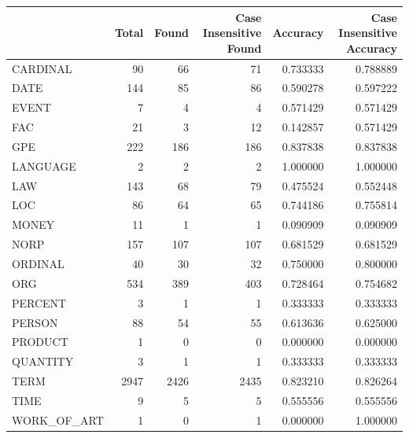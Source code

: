 \begin{tabular}{lrrrrr}
\toprule
 & Total & Found & Case Insensitive Found & Accuracy & Case Insensitive Accuracy \\
\midrule
CARDINAL & 90 & 66 & 71 & 0.733333 & 0.788889 \\
DATE & 144 & 85 & 86 & 0.590278 & 0.597222 \\
EVENT & 7 & 4 & 4 & 0.571429 & 0.571429 \\
FAC & 21 & 3 & 12 & 0.142857 & 0.571429 \\
GPE & 222 & 186 & 186 & 0.837838 & 0.837838 \\
LANGUAGE & 2 & 2 & 2 & 1.000000 & 1.000000 \\
LAW & 143 & 68 & 79 & 0.475524 & 0.552448 \\
LOC & 86 & 64 & 65 & 0.744186 & 0.755814 \\
MONEY & 11 & 1 & 1 & 0.090909 & 0.090909 \\
NORP & 157 & 107 & 107 & 0.681529 & 0.681529 \\
ORDINAL & 40 & 30 & 32 & 0.750000 & 0.800000 \\
ORG & 534 & 389 & 403 & 0.728464 & 0.754682 \\
PERCENT & 3 & 1 & 1 & 0.333333 & 0.333333 \\
PERSON & 88 & 54 & 55 & 0.613636 & 0.625000 \\
PRODUCT & 1 & 0 & 0 & 0.000000 & 0.000000 \\
QUANTITY & 3 & 1 & 1 & 0.333333 & 0.333333 \\
TERM & 2947 & 2426 & 2435 & 0.823210 & 0.826264 \\
TIME & 9 & 5 & 5 & 0.555556 & 0.555556 \\
WORK_OF_ART & 1 & 0 & 1 & 0.000000 & 1.000000 \\
\bottomrule
\end{tabular}
